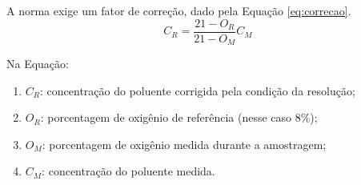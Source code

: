 \begin{figure}[!ht]
     \centering
        \caption{Limites para emissões de poluentes, de acordo com a Resolução CONAMA 382/06.}
        \label{fig:CONAMA}
     \begin{subfigure}[b]{0.8\linewidth}
         \centering
         \caption{}
         \label{fig:conama2}
     \end{subfigure}
     \hfill
     \begin{subfigure}{0.8\linewidth}
         \centering
         \caption{}
         \label{fig:conama1}
     \end{subfigure}
\end{figure}

\noindent A norma exige um fator de correção, dado pela Equação \eqref{eq:correcao}.
\begin{equation} \label{eq:correcao}
    C_R = \frac{21-O_R}{21-O_M} C_M
\end{equation}

\noindent Na Equação:
\begin{enumerate}
    \item $C_R$: concentração do poluente corrigida pela condição da resolução;
    \item $O_R$: porcentagem de oxigênio de referência (nesse caso 8\%);
    \item $O_M$: porcentagem de oxigênio medida durante a amostragem;
    \item $C_M$: concentração do poluente medida.
\end{enumerate}

